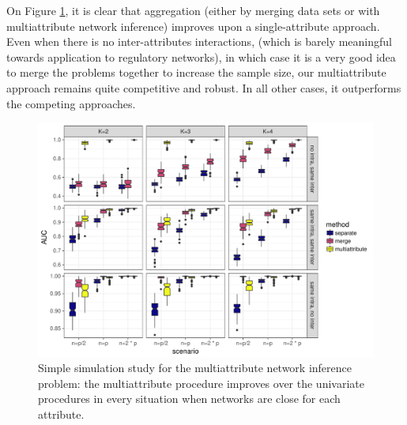 On Figure \ref{fig:simu_multi}, it is clear that aggregation (either
by merging data sets or with multiattribute network inference)
improves upon a single-attribute approach. Even when there is no
inter-attributes interactions, (which is barely meaningful towards
application to regulatory networks), in which case it is a very good
idea to merge the problems together to increase the sample size, our
multiattribute approach remains quite competitive and robust. In all
other cases, it outperforms the competing approaches.
\begin{figure}[htbp!]
  \centering
  \includegraphics[width=\textwidth]{figures/res_simu_new}
  \caption{Simple simulation study for the multiattribute network
    inference problem: the multiattribute procedure improves over the
    univariate procedures in every situation when networks are close
    for each attribute.}
  \label{fig:simu_multi}
\end{figure}
